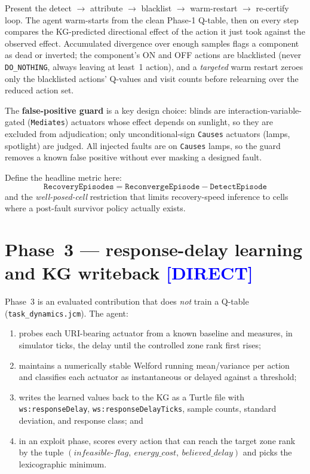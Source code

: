 \documentclass[12pt, a4paper, oneside]{memoir}
\newcommand{\evDirect}{\textcolor{blue}{[DIRECT]}}
\newcommand{\wsRD}{\texttt{ws:responseDelay}}
\begin{document}
Present the detect $\to$ attribute $\to$ blacklist $\to$ warm-restart $\to$
re-certify loop.  The agent warm-starts from the clean Phase-1 Q-table, then
on every step compares the KG-predicted directional effect of the action it
just took against the observed effect.  Accumulated divergence over enough
samples flags a component as dead or inverted; the component's ON and OFF
actions are blacklisted (never \texttt{DO\_NOTHING}, always leaving at
least~1 action), and a \emph{targeted} warm restart zeroes only the
blacklisted actions' Q-values and visit counts before relearning over the
reduced action set.

The \textbf{false-positive guard} is a key design choice: blinds are
interaction-variable-gated (\texttt{Mediates}) actuators whose effect depends
on sunlight, so they are excluded from adjudication; only
unconditional-sign \texttt{Causes} actuators (lamps, spotlight) are judged.
All injected faults are on \texttt{Causes} lamps, so the guard removes a
known false positive without ever masking a designed fault.

Define the headline metric here:
\begin{equation}
  \texttt{RecoveryEpisodes} = \texttt{ReconvergeEpisode}
                             - \texttt{DetectEpisode}
\end{equation}
and the \emph{well-posed-cell} restriction that limits recovery-speed
inference to cells where a post-fault survivor policy actually exists.

\section{Phase~3 --- response-delay learning and KG writeback \evDirect}
\label{sec:approach-phase3}

Phase~3 is an evaluated contribution that does \emph{not} train a Q-table
(\texttt{task\_dynamics.jcm}).  The agent:

\begin{enumerate}[label=(\alph*)]
  \item probes each URI-bearing actuator from a known baseline and measures,
        in simulator ticks, the delay until the controlled zone rank first
        rises;
  \item maintains a numerically stable Welford running mean/variance per
        action and classifies each actuator as instantaneous or delayed
        against a threshold;
  \item writes the learned values back to the KG as a Turtle file with
        \wsRD, \texttt{ws:responseDelayTicks}, sample counts, standard
        deviation, and response class; and
  \item in an exploit phase, scores every action that can reach the target
        zone rank by the tuple $(\textit{infeasible-flag},\
        \textit{energy\_cost},\ \textit{believed\_delay})$ and picks the
        lexicographic minimum.
\end{enumerate}
\end{document}

